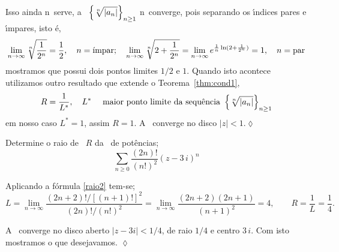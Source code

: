 Isso ainda n\ao\ serve, a \seq\ $\displaystyle{\left\{\sqrt[n]{|a_n|}\right\}_{n\geq
1}}$ n\ao\ converge, pois separando os \'{\i}ndices pares e \'{\i}mpares,
isto \'{e},
\begin{equation*}
  \lim_{n\to\infty}\sqrt[n]{\frac{1}{2^n}}=\frac{1}{2},\quad
  n=\text{\'{\i}mpar};\quad
  \lim_{n\to\infty}\sqrt[n]{2+\frac{1}{2^n}}=\lim_{n\to\infty}
  e^{\frac{1}{n}\ln(2+\frac{1}{2^n})}=1,\quad n=\text{par}
\end{equation*}
mostramos que possui dois pontos limites $1/2$ e $1$. Quando isto
acontece  utilizamos outro resultado que extende o
Teorema~\ref{thm:cond1},
\begin{equation*}
 R=\frac{1}{L^{\ast}},\quad
  L^{\ast}\quad \text{ maior ponto limite da \mbox{sequ\^encia }}\left\{\sqrt[n]{|a_n|}\right\}_{n\geq 1}
\end{equation*}
 em nosso caso $ L^{\ast}=1$, assim $R=1$. A \ser\ converge no
 disco $|z|<1$.\hfill \(\lozenge\)

\begin{exer}
Determine o raio de \conver\ $R$ da \ser\ de pot\^encias;
\begin{equation*}
  \sum_{n\geq 0}\frac{(2n)!}{(n!)^2}(z-3\,i)^n
\end{equation*}
\end{exer}

\solo  Aplicando a f\'ormula \eqref{raio2} tem-se;
\begin{equation*}
  L=\lim_{n\to\infty}\frac{(2n+2)!/[(n+1)!]^2}{(2n)!/(n!)^2}=\lim_{n\to\infty}
  \frac{(2n+2)(2n+1)}{(n+1)^2}=4, \qquad
  R=\frac{1}{L}=\frac{1}{4}.
\end{equation*}

A \ser\ converge no disco aberto $|z-3i|<1/4$, de raio $1/4$ e
centro $3\,i$. Com isto mostramos o que desejavamos. \hfill
\(\lozenge\)
